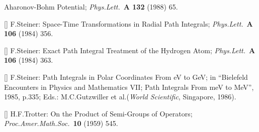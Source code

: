 Aharonov-Bohm Potential;
{\it Phys.Lett.}\ {\bf A 132} (1988) 65.
\item{[\STEa]}
F.Steiner:
Space-Time Transformations in Radial Path Integrals;
{\it Phys.Lett.}\ {\bf A 106} (1984) 356.
\item{[\STEb]}
F.Steiner:
Exact Path Integral Treatment of the Hydrogen Atom;
{\it Phys.Lett.}\ {\bf A 106} (1984) 363.
\item{[\STEc]}
F.Steiner:
Path Integrals in Polar Coordinates From eV to GeV;
in ``Bielefeld Encounters in Physics and Mathematics VII; Path
Integrals From meV to MeV'', 1985, p.335;
Eds.: M.C.Gutzwiller et al.({\it World Scientific}, Singapore, 1986).
\item{[\TROT]}
H.F.Trotter:
On the Product of Semi-Groups of Operators;
{\it Proc.Amer.Math.Soc.}\ {\bf 10} (1959) 545.



\enddocument
